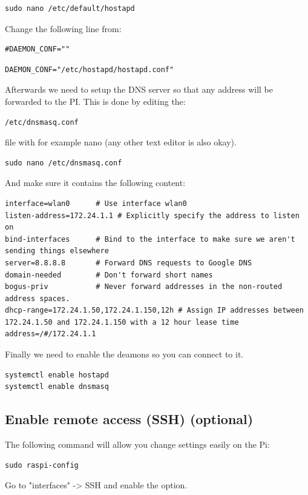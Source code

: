 \documentclass[11pt]{report}
\begin{document}
			\begin{lstlisting}
sudo nano /etc/default/hostapd
			\end{lstlisting}
			Change the following line from:			
			\begin{lstlisting}
#DAEMON_CONF=""
			\end{lstlisting}
			\begin{lstlisting}
DAEMON_CONF="/etc/hostapd/hostapd.conf"
			\end{lstlisting}
			Afterwards we need to setup the DNS server so that any address will be forwarded to the PI. This is done by editing the:
			\begin{lstlisting}
/etc/dnsmasq.conf
			\end{lstlisting}
			file with for example nano (any other text editor is also okay).
			\begin{lstlisting}
sudo nano /etc/dnsmasq.conf
			\end{lstlisting}
			And make sure it contains the following content:
			\begin{lstlisting}
interface=wlan0      # Use interface wlan0  
listen-address=172.24.1.1 # Explicitly specify the address to listen on  
bind-interfaces      # Bind to the interface to make sure we aren't sending things elsewhere  
server=8.8.8.8       # Forward DNS requests to Google DNS  
domain-needed        # Don't forward short names  
bogus-priv           # Never forward addresses in the non-routed address spaces.  
dhcp-range=172.24.1.50,172.24.1.150,12h # Assign IP addresses between 172.24.1.50 and 172.24.1.150 with a 12 hour lease time  
address=/#/172.24.1.1
			\end{lstlisting}
			Finally we need to enable the deamons so you can connect to it.
			\begin{lstlisting}
systemctl enable hostapd
systemctl enable dnsmasq
			\end{lstlisting}
		\subsection{Enable remote access (SSH) (optional)}
			The following command will allow you change settings easily on the Pi:
			\begin{lstlisting}
sudo raspi-config
			\end{lstlisting}
			Go to "interfaces" -> SSH and enable the option.
\end{document}
